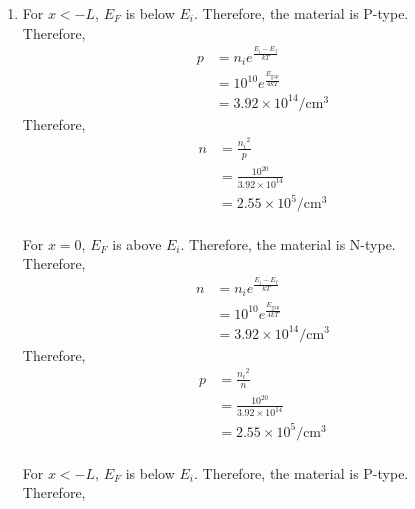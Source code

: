\documentclass[titlepage, fleqn, a4paper, 12pt, twoside]{article}
\theoremstyle{definition}
\theoremstyle{theorem}
\begin{document}
\begin{solution}
\begin{enumerate}[leftmargin=*]
\begin{figure}[H]
			\end{figure}
		\item
			For $x < -L$, $E_F$ is below $E_i$.
			Therefore, the material is P-type.\\
			Therefore,
			\begin{align*}
				p & = n_i e^{\frac{E_i - E_f}{k T}}            \\
                                  & = 10^{10} e^{\frac{E_{\text{gap}}}{4 k T}} \\
                                  & = 3.92 \times 10^{14} \si{\per\centi\metre\cubed}
			\end{align*}
			Therefore,
			\begin{align*}
				n & = \frac{{n_i}^2}{p}                   \\
                                  & = \frac{10^{20}}{3.92 \times 10^{14}} \\
                                  & = 2.55 \times 10^5 \si{\per\centi\metre\cubed}
			\end{align*}
			~\\
			For $x = 0$, $E_F$ is above $E_i$.
			Therefore, the material is N-type.\\
			Therefore,
			\begin{align*}
				n & = n_i e^{\frac{E_i - E_f}{k T}}            \\
                                  & = 10^{10} e^{\frac{E_{\text{gap}}}{4 k T}} \\
                                  & = 3.92 \times 10^{14} \si{\per\centi\metre\cubed}
			\end{align*}
			Therefore,
			\begin{align*}
				p & = \frac{{n_i}^2}{n}                   \\
                                  & = \frac{10^{20}}{3.92 \times 10^{14}} \\
                                  & = 2.55 \times 10^5 \si{\per\centi\metre\cubed}
			\end{align*}
			~\\
			For $x < -L$, $E_F$ is below $E_i$.
			Therefore, the material is P-type.\\
			Therefore,

\end{enumerate}
\end{solution}
\end{document}
